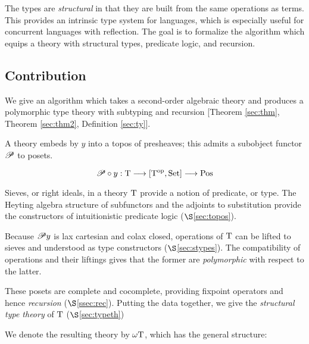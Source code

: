 \documentclass[stthol.tex]{subfiles}
\begin{document}
The types are \textit{structural} in that they are built from the same operations as terms. This provides an intrinsic type system for languages, which is especially useful for concurrent languages with reflection. The goal is to formalize the algorithm which equips a theory with structural types, predicate logic, and recursion.

\subsection{Contribution}
\label{ssec:contrib}

We give an algorithm which takes a second-order algebraic theory and produces a polymorphic type theory with subtyping and recursion [Theorem \ref{sec:thm}, Theorem \ref{sec:thm2}, Definition \ref{sec:ty}].

A theory embeds by $y$ into a topos of presheaves; this admits a subobject functor $\mathscr{P}$ to posets. %

$$\mathscr{P}\circ y: \mathrm{T} \longrightarrow [\mathrm{T}^{\mathrm{op}},\mathrm{Set}] \longrightarrow \mathrm{Pos}$$

Sieves, or right ideals, in a theory $\mathrm{T}$ provide a notion of predicate, or type. The Heyting algebra structure of subfunctors and the adjoints to substitution provide the constructors of intuitionistic predicate logic ($\S$\ref{sec:topos}).

Because $\mathscr{P} y$ is lax cartesian and colax closed, operations of $\mathrm{T}$ can be lifted to sieves and understood as type constructors ($\S$\ref{sec:stypes}). The compatibility of operations and their liftings gives that the former are \textit{polymorphic} with respect to the latter.

These posets are complete and cocomplete, providing fixpoint operators and hence \textit{recursion} ($\S$\ref{ssec:rec}). Putting the data together, we give the \textit{structural type theory} of $\mathrm{T}$ ($\S$\ref{sec:typeth})

We denote the resulting theory by $\omega\mathrm{T}$, which has the general structure:
\end{document}
